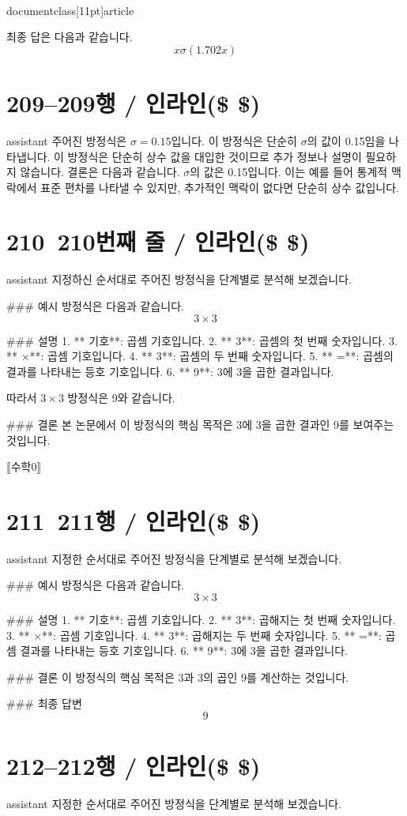 \\documentclass[11pt]{article}
\begin{document}
최종 답은 다음과 같습니다.
\[
\boxed{x \sigma(1.702 x)}
\]

\section*{209–209행 / 인라인(\$ \$)}
assistant
주어진 방정식은 \(\sigma = 0.15\)입니다. 이 방정식은 단순히 \(\sigma\)의 값이 0.15임을 나타냅니다. 이 방정식은 단순히 상수 값을 대입한 것이므로 추가 정보나 설명이 필요하지 않습니다. 결론은 다음과 같습니다. \(\sigma\)의 값은 0.15입니다. 이는 예를 들어 통계적 맥락에서 표준 편차를 나타낼 수 있지만, 추가적인 맥락이 없다면 단순히 상수 값입니다.

\section*{210~210번째 줄 / 인라인(\$ \$) }
assistant
지정하신 순서대로 주어진 방정식을 단계별로 분석해 보겠습니다.

### 예시
방정식은 다음과 같습니다.
\[ 3 \times 3 \]

### 설명
1. ** 기호**: 곱셈 기호입니다.
2. ** 3**: 곱셈의 첫 번째 숫자입니다.
3. ** ×**: 곱셈 기호입니다.
4. ** 3**: 곱셈의 두 번째 숫자입니다.
5. ** =**: 곱셈의 결과를 나타내는 등호 기호입니다.
6. ** 9**: 3에 3을 곱한 결과입니다.

따라서 \( 3 \times 3 \) 방정식은 9와 같습니다.

### 결론
본 논문에서 이 방정식의 핵심 목적은 3에 3을 곱한 결과인 9를 보여주는 것입니다.

⟦수학0⟧

\section*{211~211행 / 인라인(\$ \$) }
assistant
지정한 순서대로 주어진 방정식을 단계별로 분석해 보겠습니다.

### 예시
방정식은 다음과 같습니다.
\[ 3 \times 3 \]

### 설명
1. ** 기호**: 곱셈 기호입니다.
2. ** 3**: 곱해지는 첫 번째 숫자입니다.
3. ** ×**: 곱셈 기호입니다.
4. ** 3**: 곱해지는 두 번째 숫자입니다.
5. ** =**: 곱셈 결과를 나타내는 등호 기호입니다.
6. ** 9**: 3에 3을 곱한 결과입니다.

### 결론
이 방정식의 핵심 목적은 3과 3의 곱인 9를 계산하는 것입니다.

### 최종 답변
\[
\boxed{9}
\]

\section*{212–212행 / 인라인(\$ \$) }
assistant
지정한 순서대로 주어진 방정식을 단계별로 분석해 보겠습니다.
\end{document}
